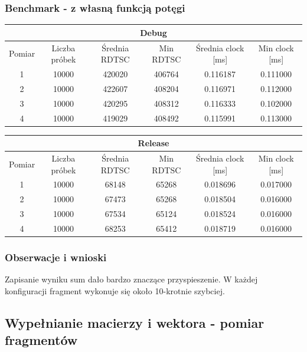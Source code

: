 \documentclass{article}
\begin{document}
	\subsubsection{Benchmark - z własną funkcją potęgi}
	\begin{center}
		\begin{tabular}{|c|c|c|c|c|c|} \hline
			\multicolumn{6}{|c|}{Debug} \\\hline
			Pomiar  & Liczba próbek & Średnia RDTSC & Min RDTSC & Średnia clock [ms] & Min clock [ms] \\\hline
			\hline
			1 & 10000 & 420020 & 406764 & 0.116187 & 0.111000 \\\hline
			2 & 10000 & 422607 & 408204 & 0.116971 & 0.112000 \\\hline
			3 & 10000 & 420295 & 408312 & 0.116333 & 0.102000 \\\hline
			4 & 10000 & 419029 & 408492 & 0.115991 & 0.113000 \\\hline
			
		\end{tabular}
	\end{center}
	\begin{center}
		\begin{tabular}{|c|c|c|c|c|c|} \hline
			\multicolumn{6}{|c|}{Release} \\\hline
			Pomiar  & Liczba próbek & Średnia RDTSC & Min RDTSC & Średnia clock [ms] & Min clock [ms] \\\hline
			\hline
			1 & 10000 & 68148 & 65268 & 0.018696 & 0.017000 \\\hline
			2 & 10000 & 67473 & 65268 & 0.018504 & 0.016000 \\\hline
			3 & 10000 & 67534 & 65124 & 0.018524 & 0.016000 \\\hline
			4 & 10000 & 68253 & 65412 & 0.018719 & 0.016000 \\\hline
			
		\end{tabular}
	\end{center}
	
	\subsubsection{Obserwacje i wnioski}
	Zapisanie wyniku sum dało bardzo znaczące przyspieszenie. W każdej konfiguracji fragment wykonuje się około 10-krotnie szybciej.
	
	\subsection{Wypełnianie macierzy i wektora - pomiar fragmentów}
\end{document}
